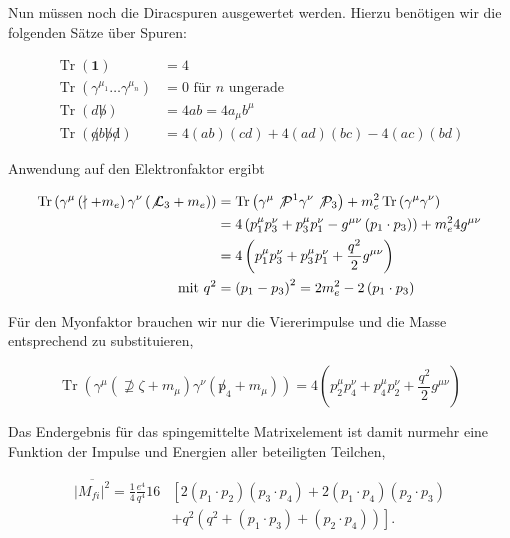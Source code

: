 \documentclass[10pt, letterpaper]{article}
\begin{document}
Nun müssen noch die Diracspuren ausgewertet werden. Hierzu benötigen wir die folgenden Sätze über Spuren:

$$
\begin{aligned}
\operatorname{Tr}(\mathbf{1}) & =4 \\
\operatorname{Tr}\left(\gamma^{\mu_{1}} \ldots \gamma^{\mu_{n}}\right) & =0 \text { für } n \text { ungerade } \\
\operatorname{Tr}(d \not b) & =4 a b=4 a_{\mu} b^{\mu} \\
\operatorname{Tr}(\not q b \not b \not d) & =4(a b)(c d)+4(a d)(b c)-4(a c)(b d)
\end{aligned}
$$

Anwendung auf den Elektronfaktor ergibt

$$
\begin{aligned}
\operatorname{Tr}\left(\gamma^{\mu}\left(\nmid+m_{e}\right) \gamma^{\nu}\left(\not \mathcal{L}_{3}+m_{e}\right)\right) & =\operatorname{Tr}\left(\gamma^{\mu} \not \mathcal{P}^{1} \gamma^{\nu} \not \mathcal{P}_{3}\right)+m_{e}^{2} \operatorname{Tr}\left(\gamma^{\mu} \gamma^{\nu}\right) \\
& =4\left(p_{1}^{\mu} p_{3}^{\nu}+p_{3}^{\mu} p_{1}^{\nu}-g^{\mu \nu}\left(p_{1} \cdot p_{3}\right)\right)+m_{e}^{2} 4 g^{\mu \nu} \\
& =4\left(p_{1}^{\mu} p_{3}^{\nu}+p_{3}^{\mu} p_{1}^{\nu}+\frac{q^{2}}{2} g^{\mu \nu}\right) \\
\text { mit } q^{2} & =\left(p_{1}-p_{3}\right)^{2}=2 m_{e}^{2}-2\left(p_{1} \cdot p_{3}\right)
\end{aligned}
$$

Für den Myonfaktor brauchen wir nur die Viererimpulse und die Masse entsprechend zu substituieren,

$$
\operatorname{Tr}\left(\gamma^{\mu}\left(\nsupseteq \zeta+m_{\mu}\right) \gamma^{\nu}\left(\not p_{4}+m_{\mu}\right)\right)=4\left(p_{2}^{\mu} p_{4}^{\nu}+p_{4}^{\mu} p_{2}^{\nu}+\frac{q^{2}}{2} g^{\mu \nu}\right)
$$

Das Endergebnis für das spingemittelte Matrixelement ist damit nurmehr eine Funktion der Impulse und Energien aller beteiligten Teilchen,

$$
\begin{aligned}
\overline{\left|M_{f i}\right|^{2}}=\frac{1}{4} \frac{e^{4}}{q^{4}} 16 & {\left[2\left(p_{1} \cdot p_{2}\right)\left(p_{3} \cdot p_{4}\right)+2\left(p_{1} \cdot p_{4}\right)\left(p_{2} \cdot p_{3}\right)\right.} \\
& \left.+q^{2}\left(q^{2}+\left(p_{1} \cdot p_{3}\right)+\left(p_{2} \cdot p_{4}\right)\right)\right] .
\end{aligned}
$$
\end{document}
